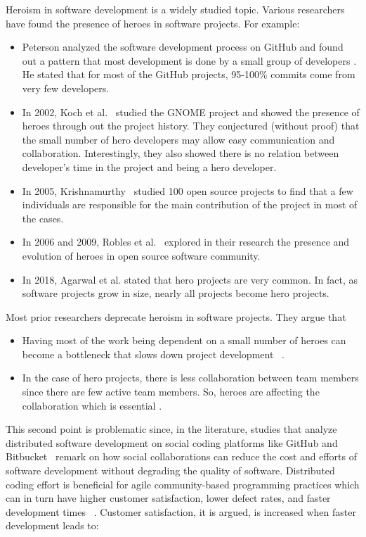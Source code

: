 \documentclass[smallextended]{svjour3}
\newcommand{\bi}{\begin{itemize}}
\newcommand{\ei}{\end{itemize}}
\begin{document}
Heroism in software development is a widely studied topic. Various researchers have found the presence of heroes in software projects. For example:
\bi
\item
Peterson analyzed the software development process on GitHub and found out a pattern that most development is done by a small group of developers \cite{Peterson}. He stated that for most of the GitHub projects, 95-100\% commits come from very few developers. 
\item
In 2002, Koch et al.~\cite{koch2002effort} studied the  GNOME project and showed the presence of heroes through out the project history. They conjectured (without proof) that  the small number of hero developers may allow easy communication and collaboration. Interestingly, they also showed there is no relation between developer's time in the project and being a hero developer. 
\item
In 2005, Krishnamurthy~\cite{KrishnamurthyS} studied 100 open source projects to find
that a few individuals are responsible for the main contribution of the project in most of the cases. 
\item
In 2006 and 2009, Robles et al.~\cite{robles2009evolution,robles2006contributor} explored in their research the presence and evolution of heroes in open source software community.
\item
In 2018, Agarwal et al. \cite{Agrawal_2018} stated that hero projects are very common. In fact, as software projects grow in size, nearly all projects become hero projects.
\ei
Most prior researchers deprecate heroism in software projects. They argue  that
\bi
\item
 Having most of the work being dependent on a small number of heroes can become a bottleneck that slows down project development ~\cite{bier2011online,morcovcomplex,hislop2002integrating,boehm2006view,wood2005multiview}.
 \item
 In  the case of hero projects, there is less collaboration between team members since there are few active team members. So, heroes are affecting the collaboration which is essential \cite{1008000,4221622}. 
 \ei
 This second point is   problematic since, in the literature,
studies that analyze  distributed software development on social coding platforms like GitHub and Bitbucket~\cite{dias2016does,cosentino2017systematic} remark
on how social collaborations can reduce the cost and efforts of software development without degrading the quality of software.
Distributed coding effort is beneficial for agile community-based programming practices which can in turn have higher customer satisfaction, lower defect rates, and faster development times ~\cite{moniruzzaman2013comparative,rastogi2017empirical}. Customer satisfaction, it is argued,  is increased when faster development leads to:
\end{document}
